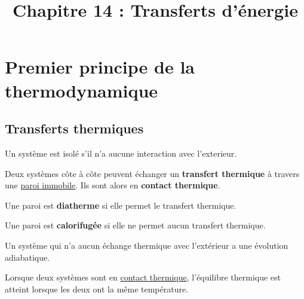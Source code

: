 \documentclass[11pt]{article}
\title{Chapitre 14 : Transferts d'énergie}
\author{}
\date{}
\theoremstyle{cstyle}{\newtheorem{definition}{Définition}[section]}
\theoremstyle{cstyle}{\newtheorem{proposition}[definition]{Propriété}}
\theoremstyle{cstyle}{\newtheorem{theorem}[definition]{Théorème}}
\theoremstyle{mystyle}{\newtheorem{lemma}[definition]{Lemme}}
\theoremstyle{mystyle}{\newtheorem{corollary}[definition]{Corollaire}}
\theoremstyle{mystyle}{\newtheorem*{remark}{Remarque}}
\theoremstyle{mystyle}{\newtheorem*{remarks}{Remarques}}
\theoremstyle{mystyle}{\newtheorem*{example}{Exemple}}
\theoremstyle{mystyle}{\newtheorem*{examples}{Exemples}}
\theoremstyle{definition}{\newtheorem*{exercise}{Exercice}}
\theoremstyle{mystyle}{\newtheorem*{methode}{Méthode}}
\theoremstyle{cstyle}{\newtheorem*{cthm}{}}
\theoremstyle{warn}
\begin{document}
	
	\maketitle
	
	\begin{minipage}[t]{0.45\textwidth}
		\section{Premier principe de la thermodynamique}
		
		\subsection{Transferts thermiques}
		\begin{definition}
			Un système est isolé s'il n'a aucune interaction avec l'exterieur.
		\end{definition}
		\begin{definition}
			Deux systèmes côte à côte peuvent échanger un \textbf{transfert thermique} à travers une \underline{paroi immobile}. Ils sont alors en \textbf{contact thermique}.
		\end{definition}
	
		\begin{definition}
			Une paroi est \textbf{diatherme} si elle permet le transfert thermique.
			
			Une paroi est \textbf{calorifugée} si elle ne permet aucun transfert thermique.
		\end{definition}
	
		\begin{definition}
			Un système qui n'a aucun échange thermique avec l'extérieur a une évolution adiabatique.
		\end{definition}
	
		\begin{proposition}
			Lorsque deux systèmes sont en \underline{contact thermique}, l'équilibre thermique est atteint lorsque les deux ont la même température.
		\end{proposition}
	
	\end{minipage}
	\hfill
	\vrule
	\hfill
\end{document}
